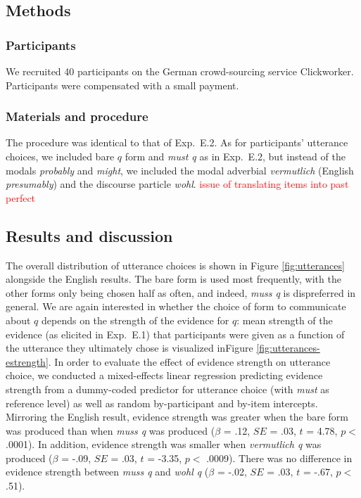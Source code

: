 \documentclass[11pt]{article}
\newcommand{\red}[1]{\textcolor{Red}{#1}}
\newcommand{\figref}[1]{Figure \ref{#1}}
\begin{document}
\subsection{Methods}

\subsubsection{Participants}

We recruited 40 participants on the German crowd-sourcing service Clickworker. Participants were compensated with a small payment.

\subsubsection{Materials and procedure}

The procedure was identical to that of Exp.~E.2. As for participants' utterance choices, we included bare $q$ form and \emph{must q} as in Exp.~E.2, but instead of the modals \emph{probably} and \emph{might}, we included the modal adverbial \emph{vermutlich} (English \emph{presumably}) and the discourse particle \emph{wohl}. \red{issue of translating items into past perfect}

\subsection{Results and discussion}

The overall distribution of utterance choices is shown in \figref{fig:utterances} alongside the English results. The bare form is used most frequently, with the other forms only being chosen half as often, and indeed, \emph{muss q} is dispreferred in general. We are again interested in whether the choice of form to communicate about $q$ depends on the strength of the evidence for $q$: mean strength of the evidence (as elicited in Exp.~E.1) that participants were given as a function of the utterance they ultimately chose is visualized in\figref{fig:utterances-estrength}.   In order to evaluate the effect of evidence strength on utterance choice, we conducted a mixed-effects linear regression predicting evidence strength from a dummy-coded predictor for utterance choice (with \emph{must} as reference level) as well as random by-participant and by-item  intercepts.  Mirroring the English result, evidence strength was greater when the bare form was produced than when \emph{muss q} was produced ($\beta$ = .12, $SE$ = .03, $t$ = 4.78, $p <$ .0001). In addition, evidence strength was smaller when \emph{vermutlich q} was produced  ($\beta$ = -.09, $SE$ = .03, $t$ = -3.35, $p <$ .0009). There was no difference in evidence strength between \emph{muss q} and \emph{wohl q}  ($\beta$ = -.02, $SE$ = .03, $t$ = -.67, $p <$ .51). 
\end{document}
